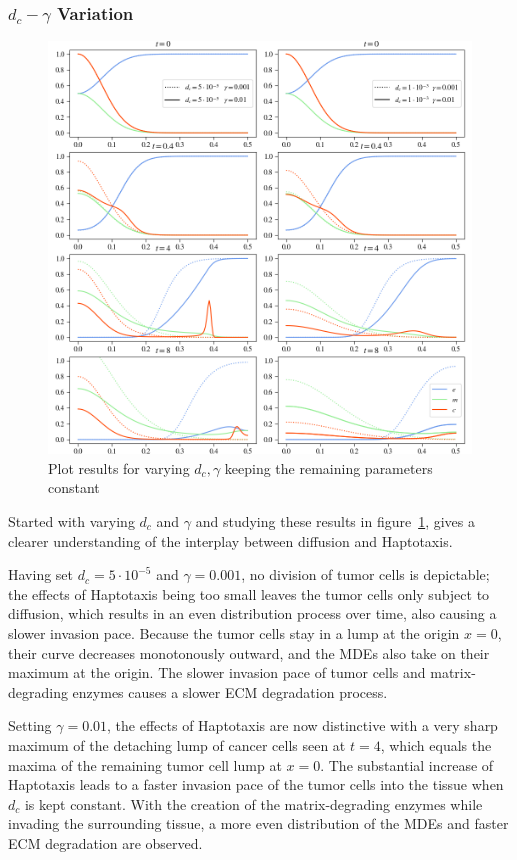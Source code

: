 \subsubsection*{$d_c - \gamma$ Variation}
\begin{figure}[h!]
 \centering
 \includegraphics[width=\textwidth]{resources/images/dc_gamma_variation.png}
 \caption{Plot results for varying $d_c, \gamma$ keeping the remaining parameters constant}
 \label{fig:dc_gamma_variation}
\end{figure}
Started with varying $d_c$ and $\gamma$ and studying these results in figure~\ref{fig:dc_gamma_variation}, gives a clearer understanding of the interplay between diffusion and Haptotaxis.

Having set $d_c=5\cdot 10^{-5}$ and $\gamma=0.001$, no division of tumor cells is depictable; the effects of Haptotaxis being too small leaves the tumor cells only subject to diffusion, which results in an even distribution process over time, also causing a slower invasion pace. Because the tumor cells stay in a lump at the origin $x=0$, their curve decreases monotonously outward, and the MDEs also take on their maximum at the origin. The slower invasion pace of tumor cells and matrix-degrading enzymes causes a slower ECM degradation process. 

Setting $\gamma=0.01$, the effects of Haptotaxis are now distinctive with a very sharp maximum of the detaching lump of cancer cells seen at $t=4$, which equals the maxima of the remaining tumor cell lump at $x=0$. The substantial increase of Haptotaxis leads to a faster invasion pace of the tumor cells into the tissue when $d_c$ is kept constant. With the creation of the matrix-degrading enzymes while invading the surrounding tissue, a more even distribution of the MDEs and faster ECM degradation are observed. 

